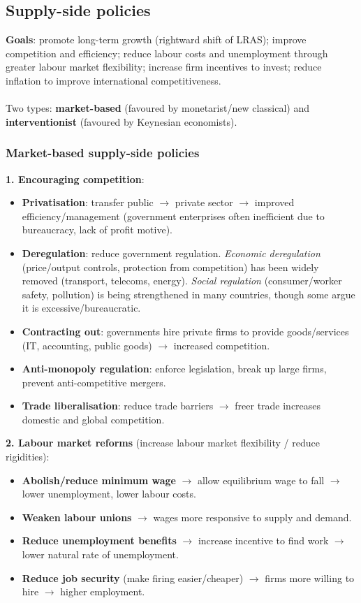 \documentclass[a4paper,12pt]{article}
\begin{document}
\subsection{Supply-side policies}
\textbf{Goals}: promote long-term growth (rightward shift of LRAS); improve competition and efficiency; reduce labour costs and unemployment through greater labour market flexibility; increase firm incentives to invest; reduce inflation to improve international competitiveness.
\\\\
Two types: \textbf{market-based} (favoured by monetarist/new classical) and \textbf{interventionist} (favoured by Keynesian economists).

\subsubsection*{Market-based supply-side policies}
\textbf{1. Encouraging competition}:
\begin{itemize}
  \item \textbf{Privatisation}: transfer public $\to$ private sector $\to$ improved efficiency/management (government enterprises often inefficient due to bureaucracy, lack of profit motive).
  \item \textbf{Deregulation}: reduce government regulation. \textit{Economic deregulation} (price/output controls, protection from competition) has been widely removed (transport, telecoms, energy). \textit{Social regulation} (consumer/worker safety, pollution) is being strengthened in many countries, though some argue it is excessive/bureaucratic.
  \item \textbf{Contracting out}: governments hire private firms to provide goods/services (IT, accounting, public goods) $\to$ increased competition.
  \item \textbf{Anti-monopoly regulation}: enforce legislation, break up large firms, prevent anti-competitive mergers.
  \item \textbf{Trade liberalisation}: reduce trade barriers $\to$ freer trade increases domestic and global competition.
\end{itemize}
\textbf{2. Labour market reforms} (increase labour market flexibility / reduce rigidities):
\begin{itemize}
  \item \textbf{Abolish/reduce minimum wage} $\to$ allow equilibrium wage to fall $\to$ lower unemployment, lower labour costs.
  \item \textbf{Weaken labour unions} $\to$ wages more responsive to supply and demand.
  \item \textbf{Reduce unemployment benefits} $\to$ increase incentive to find work $\to$ lower natural rate of unemployment.
  \item \textbf{Reduce job security} (make firing easier/cheaper) $\to$ firms more willing to hire $\to$ higher employment.
\end{itemize}
\end{document}
